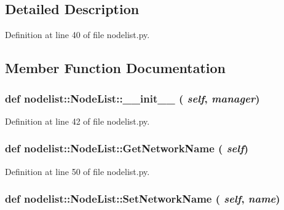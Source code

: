 \subsection{Detailed Description}




Definition at line 40 of file nodelist.py.

\subsection{Member Function Documentation}
\hypertarget{classnodelist_1_1NodeList_c6e80d9c4b17421a74aae47e39e22ffb}{
\subsubsection[\_\-\_\-init\_\-\_\-]{\setlength{\rightskip}{0pt plus 5cm}def nodelist::Node\-List::\_\-\_\-init\_\-\_\- ( {\em self},  {\em manager})}}
\label{classnodelist_1_1NodeList_c6e80d9c4b17421a74aae47e39e22ffb}




Definition at line 42 of file nodelist.py.\hypertarget{classnodelist_1_1NodeList_f251a2599ab39f05f72debe9194ef730}{
\subsubsection[GetNetworkName]{\setlength{\rightskip}{0pt plus 5cm}def nodelist::Node\-List::Get\-Network\-Name ( {\em self})}}
\label{classnodelist_1_1NodeList_f251a2599ab39f05f72debe9194ef730}




Definition at line 50 of file nodelist.py.\hypertarget{classnodelist_1_1NodeList_9d82bcfef0a88d2c9135cf5a8e2ff047}{
\subsubsection[SetNetworkName]{\setlength{\rightskip}{0pt plus 5cm}def nodelist::Node\-List::Set\-Network\-Name ( {\em self},  {\em name})}}
\label{classnodelist_1_1NodeList_9d82bcfef0a88d2c9135cf5a8e2ff047}




